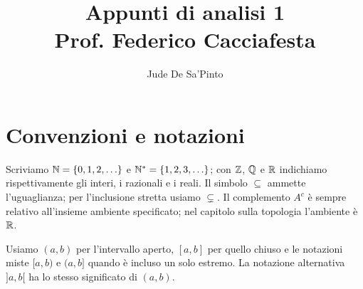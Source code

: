 \documentclass[11pt,a4paper,oneside]{report}
\title{Appunti di analisi 1\\[.8em]\large Prof. Federico Cacciafesta}
\author{Jude De Sa'Pinto}
\date{}
\begin{document}
\hypersetup{pageanchor=false}
\maketitle
\hypersetup{pageanchor=true}
\tableofcontents
\clearpage

\chapter*{Convenzioni e notazioni}
Scriviamo $\mathbb{N}=\{0,1,2,\ldots\}$ e $\mathbb{N}^*=\{1,2,3,\ldots\}$; con $\mathbb{Z}$, $\mathbb{Q}$ e $\mathbb{R}$ indichiamo rispettivamente gli interi, i razionali e i reali. Il simbolo $\subseteq$ ammette l'uguaglianza; per l'inclusione stretta usiamo $\subsetneq$. Il complemento $A^c$ è sempre relativo all'insieme ambiente specificato; nel capitolo sulla topologia l'ambiente è $\mathbb{R}$.

Usiamo $(a,b)$ per l'intervallo aperto, $[a,b]$ per quello chiuso e le notazioni miste $[a,b)$ e $(a,b]$ quando è incluso un solo estremo. La notazione alternativa $]a,b[$ ha lo stesso significato di $(a,b)$.

\clearpage
{}












\end{document}
